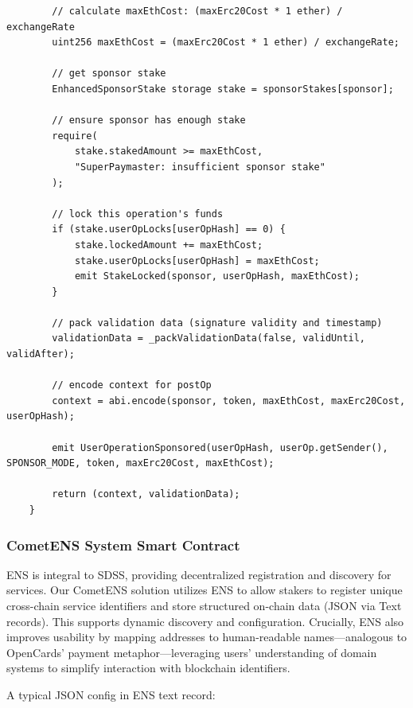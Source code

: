 \documentclass[preprint,12pt]{elsarticle}
\begin{document}
\begin{verbatim}
        // calculate maxEthCost: (maxErc20Cost * 1 ether) / exchangeRate
        uint256 maxEthCost = (maxErc20Cost * 1 ether) / exchangeRate;
        
        // get sponsor stake
        EnhancedSponsorStake storage stake = sponsorStakes[sponsor];
        
        // ensure sponsor has enough stake
        require(
            stake.stakedAmount >= maxEthCost,
            "SuperPaymaster: insufficient sponsor stake"
        );

        // lock this operation's funds
        if (stake.userOpLocks[userOpHash] == 0) {
            stake.lockedAmount += maxEthCost;
            stake.userOpLocks[userOpHash] = maxEthCost;
            emit StakeLocked(sponsor, userOpHash, maxEthCost);
        }
        
        // pack validation data (signature validity and timestamp)
        validationData = _packValidationData(false, validUntil, validAfter);
        
        // encode context for postOp
        context = abi.encode(sponsor, token, maxEthCost, maxErc20Cost, userOpHash);
        
        emit UserOperationSponsored(userOpHash, userOp.getSender(), SPONSOR_MODE, token, maxErc20Cost, maxEthCost);
        
        return (context, validationData);
    }
\end{verbatim}

\subsubsection{CometENS System Smart Contract}
\label{subsubsec:cometens-contract}

ENS is integral to SDSS, providing decentralized registration and discovery for services. Our CometENS solution utilizes ENS to allow stakers to register unique cross-chain service identifiers and store structured on-chain data (JSON via Text records). This supports dynamic discovery and configuration. Crucially, ENS also improves usability by mapping addresses to human-readable names—analogous to OpenCards' payment metaphor—leveraging users' understanding of domain systems to simplify interaction with blockchain identifiers.

A typical JSON config in ENS text record:
\end{document}
